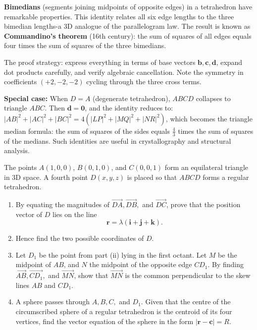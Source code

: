 \begin{takeaways}
\textbf{Bimedians} (segments joining midpoints of opposite edges) in a tetrahedron have remarkable properties. This identity relates all six edge lengths to the three bimedian lengths-a 3D analogue of the parallelogram law. The result is known as \textbf{Commandino's theorem} (16th century): the sum of squares of all edges equals four times the sum of squares of the three bimedians.

The proof strategy: express everything in terms of base vectors $\mathbf{b}, \mathbf{c}, \mathbf{d}$, expand dot products carefully, and verify algebraic cancellation. Note the symmetry in coefficients $(+2, -2, -2)$ cycling through the three cross terms.

\textbf{Special case:} When $D = A$ (degenerate tetrahedron), $ABCD$ collapses to triangle $ABC$. Then $\mathbf{d} = \mathbf{0}$, and the identity reduces to: $|AB|^2 + |AC|^2 + |BC|^2 = 4(|LP|^2 + |MQ|^2 + |NR|^2)$, which becomes the triangle median formula: the sum of squares of the sides equals $\tfrac{4}{3}$ times the sum of squares of the medians. Such identities are useful in crystallography and structural analysis.
\end{takeaways}

\vspace{1em}

\begin{problem}
The points $A(1, 0, 0)$, $B(0, 1, 0)$, and $C(0, 0, 1)$ form an equilateral triangle in 3D space. A fourth point $D(x, y, z)$ is placed so that $ABCD$ forms a regular tetrahedron.
\begin{enumerate}[label=(\roman*)]
    \item By equating the magnitudes of $\vec{DA}, \vec{DB},$ and $\vec{DC}$, prove that the position vector of $D$ lies on the line
    \[
    \mathbf{r} = \lambda(\mathbf{i} + \mathbf{j} + \mathbf{k}).
    \]
    \item Hence find the two possible coordinates of $D$.
    \item Let $D_1$ be the point from part (ii) lying in the first octant. Let $M$ be the midpoint of $AB$, and $N$ the midpoint of the opposite edge $CD_1$. By finding $\vec{AB}, \vec{CD_1},$ and $\vec{MN}$, show that $\vec{MN}$ is the common perpendicular to the skew lines $AB$ and $CD_1$.
    \item A sphere passes through $A, B, C,$ and $D_1$. Given that the centre of the circumscribed sphere of a regular tetrahedron is the centroid of its four vertices, find the vector equation of the sphere in the form $|\mathbf{r} - \mathbf{c}| = R$.
\end{enumerate}
\end{problem}


